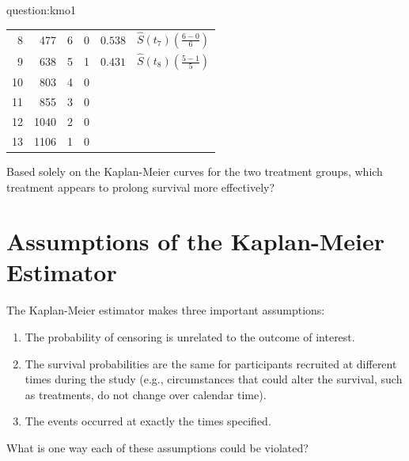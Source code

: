 \begin{question}{question:kmo1}
{\begin{center}
\begin{tabular}{rrrrll}
  8 & 477 & 6 & 0 & $0.538$ & $\hat{S}(t_7) \left(\frac{6-0}{6}\right)$\\
  9 & 638 & 5 & 1 & $0.431$ & $\hat{S}(t_8) \left(\frac{5-1}{5}\right)$\\[2mm]
  10 & 803 & 4 & 0 & \\[2mm] %
  11 & 855 & 3 & 0 & \\[2mm] %
  12 & 1040 & 2 & 0 & \\[2mm] %
  13 & 1106 & 1 & 0 & \\[2mm] %
  \bottomrule
\end{tabular}
\end{center}
}
\end{question}

\begin{question}{}
Based solely on the Kaplan-Meier curves for the two treatment groups, which treatment appears to prolong survival more effectively?
\end{question}


\section{Assumptions of the Kaplan-Meier Estimator}

The Kaplan-Meier estimator makes three important assumptions:
\begin{enumerate}
\item The probability of censoring is unrelated to the outcome of interest.
\item The survival probabilities are the same for participants recruited at different times during the study (e.g., circumstances that could alter the survival, such as treatments, do not change over calendar time).
\item The events occurred at exactly the times specified. 
\end{enumerate}

\begin{question}{}
What is one way each of these assumptions could be violated?
\end{question}

